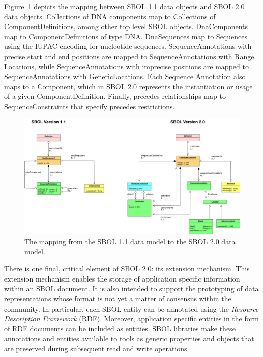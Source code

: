 
Figure~\ref{SBOL1TO2} depicts the mapping between SBOL 1.1 data objects and SBOL 2.0 data objects. Collections of DNA components map to Collections of ComponentDefinitions, among other top level SBOL objects.  DnaComponents map to ComponentDefinitions of type DNA.  DnaSequences map to Sequences using the IUPAC encoding for nucleotide sequences. SequenceAnnotations with precise start and end positions are mapped to SequenceAnnotations with Range Locations, while SequenceAnnotations with imprecise positions are mapped to SequenceAnnotations with GenericLocations. Each Sequence Annotation also maps to a Component, which in SBOL 2.0 represents the instantiation or usage of a given ComponentDefinition. Finally, precedes relationships map to SequenceConstraints that specify precedes restrictions.

\begin{figure}
\begin{center}
  \includegraphics[width=\textwidth]{images/sbol_v1_to_v2} 
\end{center}
\caption{\label{SBOL1TO2}The mapping from the SBOL 1.1 data model to the SBOL 2.0  data model.}
\end{figure}

There is one final, critical element of SBOL 2.0: its extension mechanism.  This extension mechanism enables the storage of application specific information within an SBOL document.  It is also intended to support the prototyping of data representations whose format is not yet a matter of consensus within the community.  In particular, each SBOL entity can be annotated using the \emph{Resource Description Framework} (RDF). Moreover, application specific entities in the form of RDF documents can be included as  entities. SBOL libraries make these annotations and entities available to tools as generic properties and objects that are preserved during subsequent read and write operations.

